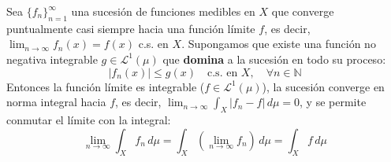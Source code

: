 \begin{teorema}
	Sea $\{f_n\}_{n=1}^\infty$ una sucesión de funciones medibles en $X$ que converge puntualmente casi siempre hacia una función límite $f$, es decir, $\lim_{n \to \infty} f_n(x) = f(x)$ c.s. en $X$. Supongamos que existe una función no negativa integrable $g \in \mathcal{L}^1(\mu)$ que \textbf{domina} a la sucesión en todo su proceso:
	$$ |f_n(x)| \le g(x) \quad \text{c.s. en } X, \quad \forall n \in \mathbb{N} $$
	Entonces la función límite es integrable ($f \in \mathcal{L}^1(\mu)$), la sucesión converge en norma integral hacia $f$, es decir, $\lim_{n \to \infty} \int_X |f_n - f| \, d\mu = 0$, y se permite conmutar el límite con la integral:
	$$ \lim_{n \to \infty} \int_X f_n \, d\mu = \int_X \left( \lim_{n \to \infty} f_n \right) \, d\mu = \int_X f \, d\mu $$
\end{teorema}

